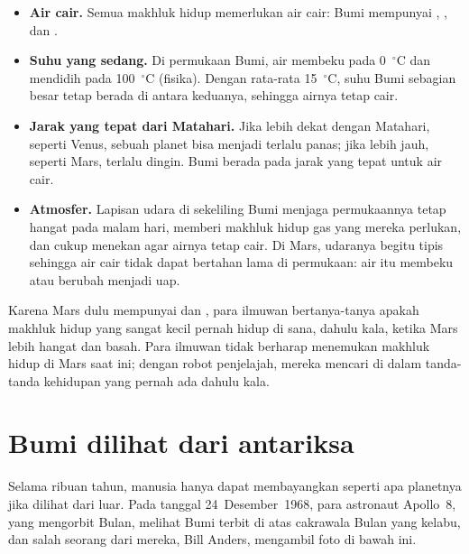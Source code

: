 \begin{itemize}
  \item \textbf{Air cair.} Semua makhluk hidup memerlukan air cair: Bumi
        mempunyai , , dan .
  \item \textbf{Suhu yang sedang.} Di permukaan Bumi, air membeku pada
        0~$^\circ$C dan mendidih pada 100~$^\circ$C (fisika). Dengan
        rata-rata 15~$^\circ$C, suhu Bumi sebagian besar tetap berada di
        antara keduanya, sehingga airnya tetap cair.
  \item \textbf{Jarak yang tepat dari Matahari.} Jika lebih dekat dengan
        Matahari, seperti Venus, sebuah planet bisa menjadi terlalu panas;
        jika lebih jauh, seperti Mars, terlalu dingin. Bumi berada pada jarak
        yang tepat untuk air cair.
  \item \textbf{Atmosfer.} Lapisan udara di sekeliling Bumi menjaga
        permukaannya tetap hangat pada malam hari, memberi makhluk hidup
        gas yang mereka perlukan, dan cukup menekan  agar airnya
        tetap cair. Di Mars, udaranya begitu tipis sehingga air cair tidak
        dapat bertahan lama di permukaan: air itu membeku atau berubah
        menjadi uap.
\end{itemize}

\begin{remark}\label{rem:g6:earth-a-planet:mars-life}
Karena Mars dulu mempunyai  dan , para ilmuwan bertanya-tanya
apakah makhluk hidup yang sangat kecil pernah hidup di sana, dahulu kala,
ketika Mars lebih hangat dan basah. Para ilmuwan tidak berharap menemukan
makhluk hidup di Mars saat ini; dengan robot penjelajah, mereka mencari di
dalam  tanda-tanda kehidupan yang pernah ada dahulu kala.
\end{remark}

\section{Bumi dilihat dari antariksa}

Selama ribuan tahun, manusia hanya dapat membayangkan seperti apa planetnya
jika dilihat dari luar. Pada tanggal 24~Desember~1968, para astronaut
Apollo~8, yang mengorbit Bulan, melihat Bumi terbit di atas cakrawala Bulan
yang kelabu, dan salah seorang dari mereka, Bill Anders, mengambil foto di
bawah ini.

